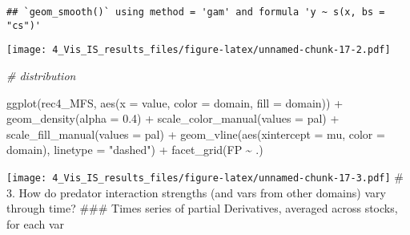 \documentclass[
]{article}
\newenvironment{Shaded}{\begin{snugshade}}{\end{snugshade}}
\newcommand{\AttributeTok}[1]{\textcolor[rgb]{0.77,0.63,0.00}{#1}}
\newcommand{\CommentTok}[1]{\textcolor[rgb]{0.56,0.35,0.01}{\textit{#1}}}
\newcommand{\FloatTok}[1]{\textcolor[rgb]{0.00,0.00,0.81}{#1}}
\newcommand{\FunctionTok}[1]{\textcolor[rgb]{0.00,0.00,0.00}{#1}}
\newcommand{\NormalTok}[1]{#1}
\newcommand{\SpecialCharTok}[1]{\textcolor[rgb]{0.00,0.00,0.00}{#1}}
\newcommand{\StringTok}[1]{\textcolor[rgb]{0.31,0.60,0.02}{#1}}
\begin{document}
\begin{verbatim}
## `geom_smooth()` using method = 'gam' and formula 'y ~ s(x, bs = "cs")'
\end{verbatim}

\texttt{[image: 4\_Vis\_IS\_results\_files/figure-latex/unnamed-chunk-17-2.pdf]}

\begin{Shaded}
\begin{Highlighting}[]
\CommentTok{\# distribution}

\FunctionTok{ggplot}\NormalTok{(rec4\_MFS, }\FunctionTok{aes}\NormalTok{(}\AttributeTok{x =}\NormalTok{ value, }\AttributeTok{color =}\NormalTok{ domain, }\AttributeTok{fill =}\NormalTok{ domain)) }\SpecialCharTok{+}
  \FunctionTok{geom\_density}\NormalTok{(}\AttributeTok{alpha =} \FloatTok{0.4}\NormalTok{) }\SpecialCharTok{+}
  \FunctionTok{scale\_color\_manual}\NormalTok{(}\AttributeTok{values =}\NormalTok{ pal) }\SpecialCharTok{+}
  \FunctionTok{scale\_fill\_manual}\NormalTok{(}\AttributeTok{values =}\NormalTok{ pal) }\SpecialCharTok{+}
    \FunctionTok{geom\_vline}\NormalTok{(}\FunctionTok{aes}\NormalTok{(}\AttributeTok{xintercept =}\NormalTok{ mu, }\AttributeTok{color =}\NormalTok{ domain),}
             \AttributeTok{linetype =} \StringTok{"dashed"}\NormalTok{) }\SpecialCharTok{+} 
  \FunctionTok{facet\_grid}\NormalTok{(FP }\SpecialCharTok{\textasciitilde{}}\NormalTok{ .)}
\end{Highlighting}
\end{Shaded}

\texttt{[image: 4\_Vis\_IS\_results\_files/figure-latex/unnamed-chunk-17-3.pdf]}
\# 3. How do predator interaction strengths (and vars from other
domains) vary through time? \#\#\# Times series of partial Derivatives,
averaged across stocks, for each var
\end{document}
